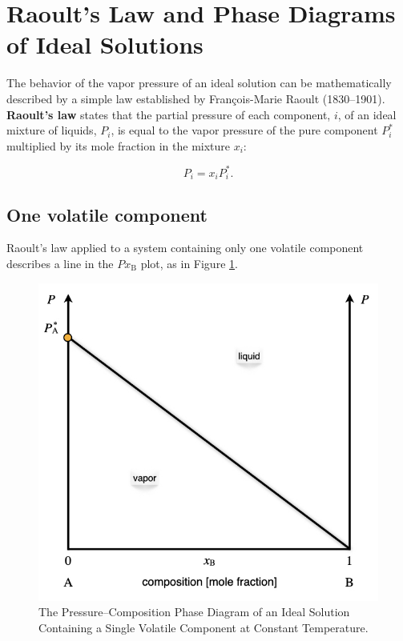 \documentclass[
  9pt,
]{extbook}
\theoremstyle{definition}
\theoremstyle{definition}
\theoremstyle{definition}
\theoremstyle{remark}
\begin{document}
\hypertarget{raoults-law-and-phase-diagrams-of-ideal-solutions}{%
\section{Raoult's Law and Phase Diagrams of Ideal Solutions}\label{raoults-law-and-phase-diagrams-of-ideal-solutions}}

The behavior of the vapor pressure of an ideal solution can be mathematically described by a simple law established by François-Marie Raoult (1830--1901). \textbf{Raoult's law} states that the partial pressure of each component, \(i\), of an ideal mixture of liquids, \(P_i\), is equal to the vapor pressure of the pure component \(P_i^*\) multiplied by its mole fraction in the mixture \(x_i\):

\begin{equation}
P_i=x_i P_i^*.
\label{eq:mc1}
\end{equation}

\hypertarget{one-volatile-component}{%
\subsection{One volatile component}\label{one-volatile-component}}

Raoult's law applied to a system containing only one volatile component describes a line in the \(Px_{\text{B}}\) plot, as in Figure \ref{fig:FigMC1}.

\begin{figure}

{\centering \includegraphics[width=0.6\linewidth]{./img/OEP_Figures.019} 

}

\caption{The Pressure–Composition Phase Diagram of an Ideal Solution Containing a Single Volatile Component at Constant Temperature.}\label{fig:FigMC1}
\end{figure}
\end{document}
